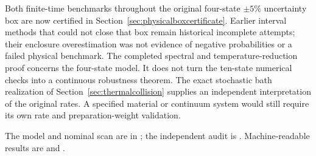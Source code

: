 Both finite-time benchmarks throughout the original four-state $\pm5\%$
uncertainty box are now certified in Section~\ref{sec:physicalboxcertificate}.
Earlier interval methods that could not close that box remain historical
incomplete attempts; their enclosure overestimation was not evidence of
negative probabilities or a failed physical benchmark. The completed
spectral and temperature-reduction proof concerns the four-state model.
It does not turn the ten-state numerical checks into a continuous
robustness theorem. The exact stochastic bath realization of
Section~\ref{sec:thermalcollision} supplies an independent interpretation
of the original rates. A specified material or continuum system would
still require its own rate and preparation-weight validation.

The model and nominal scan are in
; the independent audit is
. Machine-readable results
are  and
.
